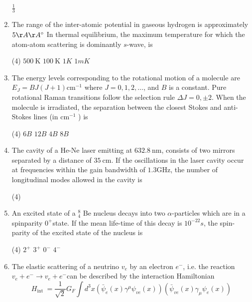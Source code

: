 \begin{enumerate}
\begin{tasks}
	\task[\textbf{d.}] $\frac{1}{3}$
\end{tasks}
\item The range of the inter-atomic potential in gaseous hydrogen is approximately $5 \AA \AA^{\circ}$ In thermal equilibrium, the maximum temperature for which the atom-atom scattering is dominantly $s$-wave, is
 \begin{tasks}(4)
	\task[\textbf{a.}]$500 \mathrm{~K}$
	\task[\textbf{b.}]$100 \mathrm{~K}$
	\task[\textbf{c.}] $1 K$
	\task[\textbf{d.}] $1 m K$
\end{tasks}
\item The energy levels corresponding to the rotational motion of a molecule are $E_{J}=B J(J+1) \mathrm{cm}^{-1}$ where $J=0,1,2, \ldots$, and $B$ is a constant. Pure rotational Raman transitions follow the selection rule $\Delta J=0, \pm 2$. When the molecule is irradiated, the separation between the closest Stokes and anti-Stokes lines (in $\mathrm{cm}^{-1}$ ) is
 \begin{tasks}(4)
	\task[\textbf{a.}] $6 B$
	\task[\textbf{b.}]$12 B$
	\task[\textbf{c.}]$4 B$
	\task[\textbf{d.}]$8 B$ 
\end{tasks}
\item The cavity of a He-Ne laser emitting at $632.8 \mathrm{~nm}$, consists of two mirrors separated by a distance of $35 \mathrm{~cm}$. If the oscillations in the laser cavity occur at frequencies within the gain bandwidth of $1.3 \mathrm{GHz}$, the number of longitudinal modes allowed in the cavity is
 \begin{tasks}(4)
\end{tasks}
\item An excited state of a ${ }_{4}^{8}$ Be nucleus decays into two $\alpha$-particles which are in a spinparity $0^{+}$state. If the mean life-time of this decay is $10^{-22} s$, the spin-parity of the excited state of the nucleus is
 \begin{tasks}(4)
	\task[\textbf{a.}]$2^{+}$
	\task[\textbf{b.}]$3^{+}$
	\task[\textbf{c.}]$0^{-}$
	\task[\textbf{d.}]$4^{-}$ 
\end{tasks}
\item The elastic scattering of a neutrino $v_{e}$ by an electron $e^{-}$, i.e. the reaction $v_{e}+e^{-} \rightarrow v_{e}+e^{-}$can be described by the interaction Hamiltonian
$$
H_{\text {int }}=\frac{1}{\sqrt{2}} G_{F} \int d^{3} x\left(\bar{\psi}_{e}(x) \gamma^{\mu} \psi_{v e}(x)\right)\left(\bar{\psi}_{v e}(x) \gamma_{\mu} \psi_{e}(x)\right)
$$
\end{enumerate}
